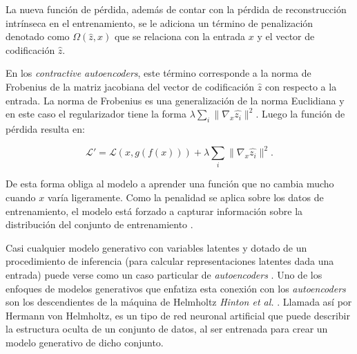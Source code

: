 La nueva función de pérdida, además de contar con la pérdida de reconstrucción intrínseca en el entrenamiento, se le adiciona un término de penalización denotado como $\Omega(\hat{z}, x)$ que se relaciona con la entrada $x$ y el vector de codificación $\hat{z}$. 

En los \textit{contractive autoencoders}, este término corresponde a la norma de Frobenius de la matriz jacobiana del vector de codificación $\hat{z}$ con respecto a la entrada. La norma de Frobenius es una generalización de la norma Euclidiana y en este caso el regularizador tiene la forma $\lambda\sum_{i} \parallel \nabla_{x} \hat{z_i}\parallel^{2}$. Luego la función de pérdida resulta en:

\begin{equation}
\mathcal{L'} = \mathcal{L}(x, g(f(x))) + \lambda\sum_{i} \parallel \nabla_{x} \hat{z_i}\parallel^{2}.
\end{equation}

De esta forma obliga al modelo a aprender una función que no cambia mucho cuando $x$ varía ligeramente. Como la penalidad se aplica sobre los datos de entrenamiento, el modelo está forzado a capturar información sobre la distribución del conjunto de entrenamiento \cite{BengioGood}.

Casi cualquier modelo generativo con variables latentes y dotado de un procedimiento de inferencia (para calcular representaciones latentes dada una entrada) puede verse como un caso particular de \textit{autoencoders} \cite{BengioGood}. Uno de los enfoques de modelos generativos que enfatiza esta conexión con los \textit{autoencoders} son los descendientes de la máquina de Helmholtz \textit{Hinton et al.} \cite{Hinton1995}. Llamada así por Hermann von Helmholtz, es un tipo de red neuronal artificial que puede describir la estructura oculta de un conjunto de datos, al ser entrenada para crear un modelo generativo de dicho conjunto. 


